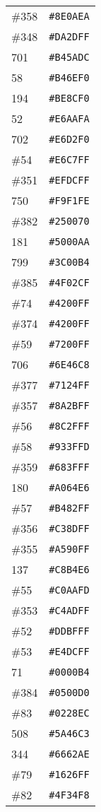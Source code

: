 \documentclass[a4paper]{article}
\begin{document}
\begin{longtable}{|l|r|}
\#358 & \texttt{\#8E0AEA} \\
\#348 & \texttt{\#DA2DFF} \\
701 & \texttt{\#B45ADC} \\
58 & \texttt{\#B46EF0} \\
194 & \texttt{\#BE8CF0} \\
52 & \texttt{\#E6AAFA} \\
702 & \texttt{\#E6D2F0} \\
\#54 & \texttt{\#E6C7FF} \\
\#351 & \texttt{\#EFDCFF} \\
750 & \texttt{\#F9F1FE} \\
\#382 & \texttt{\#250070} \\
181 & \texttt{\#5000AA} \\
799 & \texttt{\#3C00B4} \\
\#385 & \texttt{\#4F02CF} \\
\#74 & \texttt{\#4200FF} \\
\#374 & \texttt{\#4200FF} \\
\#59 & \texttt{\#7200FF} \\
706 & \texttt{\#6E46C8} \\
\#377 & \texttt{\#7124FF} \\
\#357 & \texttt{\#8A2BFF} \\
\#56 & \texttt{\#8C2FFF} \\
\#58 & \texttt{\#933FFD} \\
\#359 & \texttt{\#683FFF} \\
180 & \texttt{\#A064E6} \\
\#57 & \texttt{\#B482FF} \\
\#356 & \texttt{\#C38DFF} \\
\#355 & \texttt{\#A590FF} \\
137 & \texttt{\#C8B4E6} \\
\#55 & \texttt{\#C0AAFD} \\
\#353 & \texttt{\#C4ADFF} \\
\#52 & \texttt{\#DDBFFF} \\
\#53 & \texttt{\#E4DCFF} \\
71 & \texttt{\#0000B4} \\
\#384 & \texttt{\#0500D0} \\
\#83 & \texttt{\#0228EC} \\
508 & \texttt{\#5A46C3} \\
344 & \texttt{\#6662AE} \\
\#79 & \texttt{\#1626FF} \\
\#82 & \texttt{\#4F34F8} \\

\end{longtable}
\end{document}
